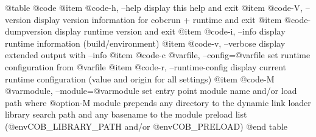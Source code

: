 @table @code
@item @code{-h, --help}
display this help and exit
@item @code{-V, --version}
display version information for cobcrun + runtime and exit
@item @code{-dumpversion}
display runtime version and exit
@item @code{-i, --info}
display runtime information (build/environment)
@item @code{-v, --verbose}
display extended output with --info
@item @code{-c @var{file}, --config=@var{file}}
set runtime configuration from @var{file}
@item @code{-r, --runtime-config}
display current runtime configuration
(value and origin for all settings)
@item @code{-M @var{module}, --module=@var{module}}
set entry point module name and/or load path
where @option{-M} module prepends any directory to the
dynamic link loader library search path
and any basename to the module preload list
(@env{COB_LIBRARY_PATH} and/or @env{COB_PRELOAD})
@end table
